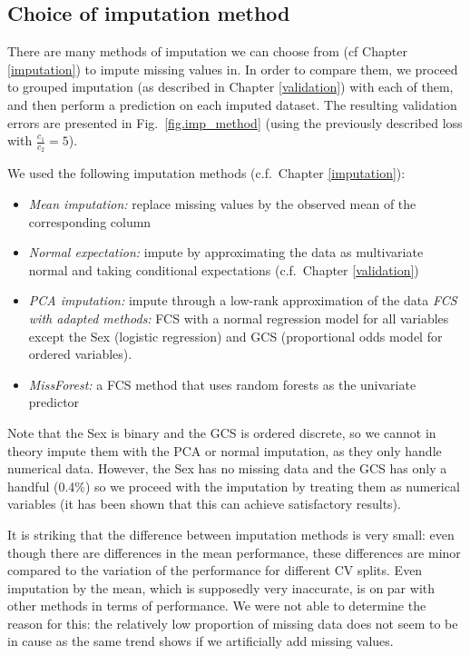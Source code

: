 		\subsection{Choice of imputation method}
		\label{choice.imp}
There are many methods of imputation we can choose from (cf Chapter \ref{imputation}) to impute missing values in. In order to compare them, we proceed to grouped imputation (as described in Chapter \ref{validation}) with each of them, and then perform a prediction on each imputed dataset. The resulting validation errors are presented in Fig.\ \ref{fig.imp_method} (using the previously described loss with $\frac{c_1}{c_2}=5$).

We used the following imputation methods (c.f.\ Chapter \ref{imputation}):
\begin{itemize}
\item \emph{Mean imputation:} replace missing values by the observed mean of the corresponding column
\item \emph{Normal expectation:} impute by approximating the data as multivariate normal and taking conditional expectations (c.f.\ Chapter \ref{validation})
\item \emph{PCA imputation:} impute through a low-rank approximation of the data
\emph{FCS with adapted methods:} FCS with a normal regression model for all variables except the Sex (logistic regression) and GCS (proportional odds model for ordered variables).
\item \emph{MissForest:} a FCS method that uses random forests \cite{svetnik2003RF} as the univariate predictor
\end{itemize}

Note that the Sex is binary and the GCS is ordered discrete, so we cannot in theory impute them with the PCA or normal imputation, as they only handle numerical data. However, the Sex has no missing data and the GCS has only a handful (0.4\%) so we proceed with the imputation by treating them as numerical variables (it has been shown \cite{bernaards2007robustness} that this can achieve satisfactory results).



It is striking that the difference between imputation methods is very small: even though there are differences in the mean performance, these differences are minor compared to the variation of the performance for different CV splits. Even imputation by the mean, which is supposedly very inaccurate, is on par with other methods in terms of performance. We were not able to determine the reason for this: the relatively low proportion of missing data does not seem to be in cause as the same trend shows if we artificially add missing values.


